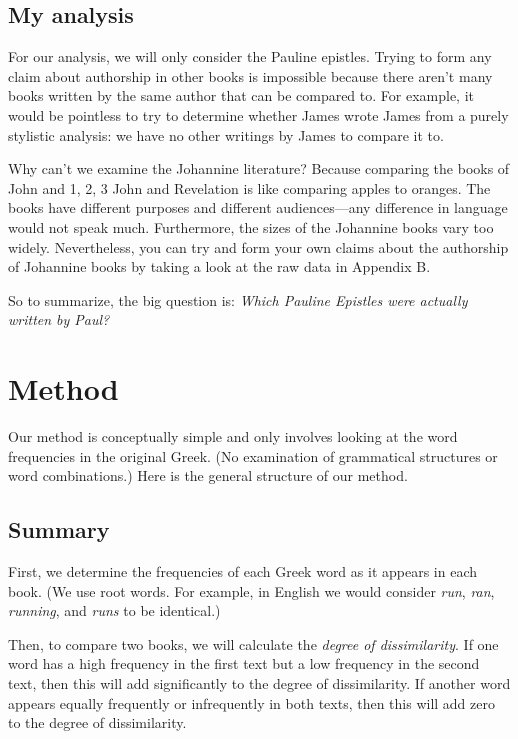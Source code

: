 \documentclass[12pt,letterpaper]{article}
\begin{document}
\subsection{My analysis}

For our analysis, we will only consider the Pauline epistles.  Trying to form any claim about authorship in other books is impossible because there aren't many books written by the same author that can be compared to.  For example, it would be pointless to try to determine whether James wrote James from a purely stylistic analysis: we have no other writings by James to compare it to.  

Why can't we examine the Johannine literature?  Because comparing the books of John and 1, 2, 3 John and Revelation is like comparing apples to oranges.  The books have different purposes and different audiences---any difference in language would not speak much.  Furthermore, the sizes of the Johannine books vary too widely.  Nevertheless, you can try and form your own claims about the authorship of Johannine books by taking a look at the raw data in Appendix B.

So to summarize, the big question is: \emph{Which Pauline Epistles were actually written by Paul?}

\section{Method}
Our method is conceptually simple and only involves looking at the word frequencies in the original Greek.  (No examination of grammatical structures or word combinations.)  Here is the general structure of our method. 

\subsection{Summary} 

First, we determine the frequencies of each Greek word as it appears in each book.  (We use root words.  For example, in English we would consider \emph{run}, \emph{ran}, \emph{running}, and \emph{runs} to be identical.)  

Then, to compare two books, we will calculate the \emph{degree of dissimilarity}.  If one word has a high frequency in the first text but a low frequency in the second text, then this will add significantly to the degree of dissimilarity.  If another word appears equally frequently or infrequently in both texts, then this will add zero to the degree of dissimilarity.  
\end{document}
